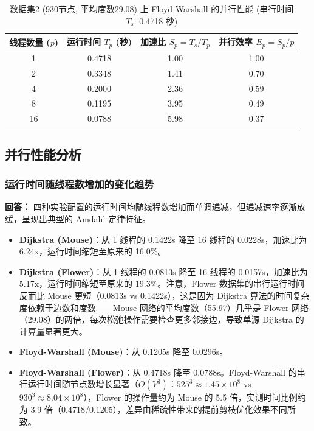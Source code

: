 \documentclass{SYSUReport}
\begin{document}
\begin{table}[H]
  \centering
  \caption{数据集2 (930节点, 平均度数29.08) 上 Floyd-Warshall 的并行性能 (串行时间 $T_s$: 0.4718 秒)}
  \label{tab:results_flower_fw}
  \begin{tabular}{cccc}
    \toprule
    \textbf{线程数量 ($p$)} & \textbf{运行时间 $T_p$ (秒)} & \textbf{加速比 $S_p = T_s / T_p$} & \textbf{并行效率 $E_p = S_p / p$} \\
    \midrule
    1   & 0.4718 & 1.00 & 1.00 \\
    2   & 0.3348 & 1.41 & 0.70 \\
    4   & 0.2000 & 2.36 & 0.59 \\
    8   & 0.1195 & 3.95 & 0.49 \\
    16  & 0.0788 & 5.98 & 0.37 \\
    \bottomrule
  \end{tabular}
\end{table}

\subsection{并行性能分析}

\subsubsection{运行时间随线程数增加的变化趋势}

\textbf{回答：} 四种实验配置的运行时间均随线程数增加而单调递减，但递减速率逐渐放缓，呈现出典型的 Amdahl 定律特征。

\begin{itemize}
    \item \textbf{Dijkstra (Mouse)}：从 1 线程的 0.1422s 降至 16 线程的 0.0228s，加速比为 6.24x，运行时间缩短至原来的 16.0\%。
    \item \textbf{Dijkstra (Flower)}：从 1 线程的 0.0813s 降至 16 线程的 0.0157s，加速比为 5.17x，运行时间缩短至原来的 19.3\%。注意，Flower 数据集的串行运行时间反而比 Mouse 更短（0.0813s vs 0.1422s），这是因为 Dijkstra 算法的时间复杂度依赖于边数和度数——Mouse 网络的平均度数（55.97）几乎是 Flower 网络（29.08）的两倍，每次松弛操作需要检查更多邻接边，导致单源 Dijkstra 的计算量显著更大。
    \item \textbf{Floyd-Warshall (Mouse)}：从 0.1205s 降至 0.0296s。
    \item \textbf{Floyd-Warshall (Flower)}：从 0.4718s 降至 0.0788s。Floyd-Warshall 的串行运行时间随节点数增长显著（$O(V^3)$：$525^3 \approx 1.45 \times 10^8$ vs $930^3 \approx 8.04 \times 10^8$），Flower 的操作量约为 Mouse 的 5.5 倍，实测时间比例约为 3.9 倍（0.4718/0.1205），差异由稀疏性带来的提前剪枝优化效果不同所致。
\end{itemize}
\end{document}
